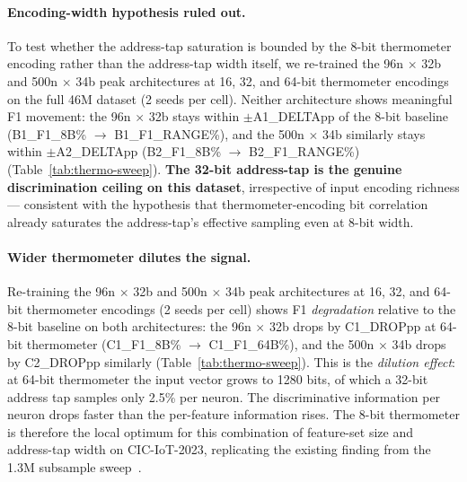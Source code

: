 \paragraph{Encoding-width hypothesis ruled out.}
To test whether the address-tap saturation is bounded by the 8-bit
thermometer encoding rather than the address-tap width itself, we
re-trained the 96n $\times$ 32b and 500n $\times$ 34b peak architectures
at 16, 32, and 64-bit thermometer encodings on the full 46M dataset
(2 seeds per cell). Neither architecture shows meaningful F1
movement: the 96n $\times$ 32b stays within $\pm$A1\_DELTApp of the
8-bit baseline (B1\_F1\_8B\% $\to$ B1\_F1\_RANGE\%), and the 500n
$\times$ 34b similarly stays within $\pm$A2\_DELTApp (B2\_F1\_8B\%
$\to$ B2\_F1\_RANGE\%) (Table~\ref{tab:thermo-sweep}).
\textbf{The 32-bit address-tap is the genuine discrimination ceiling
on this dataset}, irrespective of input encoding richness ---
consistent with the hypothesis that thermometer-encoding bit
correlation already saturates the address-tap's effective sampling
even at 8-bit width.


\paragraph{Wider thermometer dilutes the signal.}
Re-training the 96n $\times$ 32b and 500n $\times$ 34b peak
architectures at 16, 32, and 64-bit thermometer encodings (2 seeds
per cell) shows F1 \emph{degradation} relative to the 8-bit baseline
on both architectures: the 96n $\times$ 32b drops by C1\_DROPpp at
64-bit thermometer (C1\_F1\_8B\% $\to$ C1\_F1\_64B\%), and the 500n
$\times$ 34b drops by C2\_DROPpp similarly (Table~\ref{tab:thermo-sweep}).
This is the \emph{dilution effect}: at 64-bit thermometer the
input vector grows to 1280 bits, of which a 32-bit address tap
samples only 2.5\% per neuron. The discriminative information per
neuron drops faster than the per-feature information rises.
The 8-bit thermometer is therefore the local optimum for this
combination of feature-set size and address-tap width on
CIC-IoT-2023, replicating the existing finding from the 1.3M
subsample sweep~\cite{paper-discussion}.


